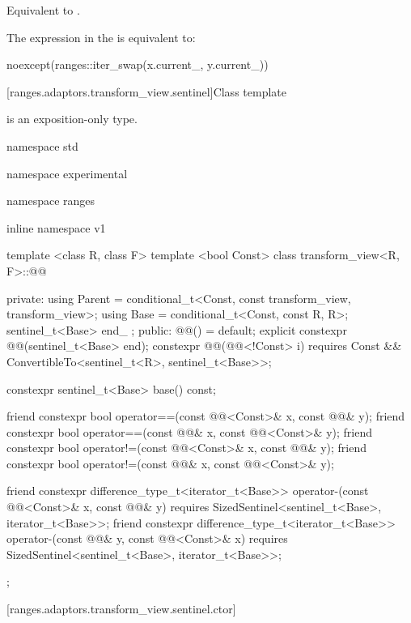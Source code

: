 \begin{itemdescr}
\pnum
\effects Equivalent to .

\pnum
\remarks The expression in the  is equivalent to:
\begin{codeblock}
noexcept(ranges::iter_swap(x.current_, y.current_))
\end{codeblock}
\end{itemdescr}


[ranges.adaptors.transform_view.sentinel]{Class template }

\pnum
{} is an exposition-only type.

\begin{codeblock}
namespace std { namespace experimental { namespace ranges { inline namespace v1 {
  template <class R, class F>
  template <bool Const>
  class transform_view<R, F>::@@ {
  private:
    using Parent = conditional_t<Const, const transform_view, transform_view>;
    using Base = conditional_t<Const, const R, R>;
    sentinel_t<Base> end_ {};
  public:
    @@() = default;
    explicit constexpr @@(sentinel_t<Base> end);
    constexpr @@(@@<!Const> i)
      requires Const && ConvertibleTo<sentinel_t<R>, sentinel_t<Base>>;

    constexpr sentinel_t<Base> base() const;

    friend constexpr bool operator==(const @@<Const>& x, const @@& y);
    friend constexpr bool operator==(const @@& x, const @@<Const>& y);
    friend constexpr bool operator!=(const @@<Const>& x, const @@& y);
    friend constexpr bool operator!=(const @@& x, const @@<Const>& y);

    friend constexpr difference_type_t<iterator_t<Base>>
      operator-(const @@<Const>& x, const @@& y)
        requires SizedSentinel<sentinel_t<Base>, iterator_t<Base>>;
    friend constexpr difference_type_t<iterator_t<Base>>
      operator-(const @@& y, const @@<Const>& x)
        requires SizedSentinel<sentinel_t<Base>, iterator_t<Base>>;
  };
}}}}
\end{codeblock}

[ranges.adaptors.transform_view.sentinel.ctor]{}


